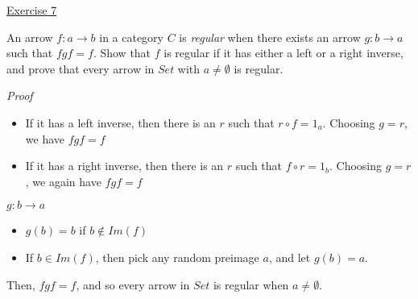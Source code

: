 \noindent
\underline{Exercise 7}
\vspace{2mm}

An arrow $f: a \to b$ in a category $C$ is \emph{regular} when there exists an arrow $g: b \to a$
such that $f g f = f$. Show that $f$ is regular if it has either a left or a right inverse,
and prove that every arrow in $Set$ with $a \neq \emptyset$ is regular.

\vspace{2mm}

\noindent
\emph{Proof}

\begin{itemize}
	\item If it has a left inverse, then there is an $r$ such that $r \circ f = 1_a$. Choosing $g = r$, we have $f g f = f$
	\item If it has a right inverse, then there is an $r$ such that $f \circ r = 1_b$. Choosing $g = r$, we again have $f g f = f$
\end{itemize}

$g: b \to a$
\begin{itemize}
    \item $g(b) = b$ if $b \notin Im(f)$
    \item If $b \in Im(f)$, then pick any random preimage $a$, and let $g(b) =
        a$.
\end{itemize}

Then, $fgf = f$, and so every arrow in $Set$ is regular when $a \neq \emptyset$.

\vspace{2mm}
